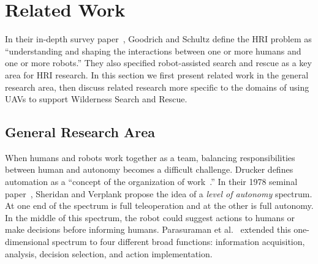 \section{Related Work}
\label{related}

In their in-depth survey paper~\cite{Goodrich2007HRISurvey}, Goodrich and Schultz define the HRI problem as ``understanding and shaping the interactions between one or more humans and one or more robots.'' They also specified robot-assisted search and rescue as a key area for HRI research. In this section we first present related work in the general research area, then discuss related research more specific to the domains of using UAVs to support Wilderness Search and Rescue.

\subsection{General Research Area}

When humans and robots work together as a team, balancing responsibilities between human and autonomy becomes a difficult challenge. Drucker defines automation as a ``concept of the organization of work~\cite{Drucker2006Practice}.'' In their 1978 seminal paper~\cite{Sheridan1978Human}, Sheridan and Verplank propose the idea of a \textit{level of autonomy} spectrum. At one end of the spectrum is full teleoperation and at the other is full autonomy. In the middle of this spectrum, the robot could suggest actions to humans or make decisions before informing humans. Parasuraman et al.\ \cite{Parasuraman2000Model} extended this one-dimensional spectrum to four different broad functions: information acquisition, analysis, decision selection, and action implementation. 

